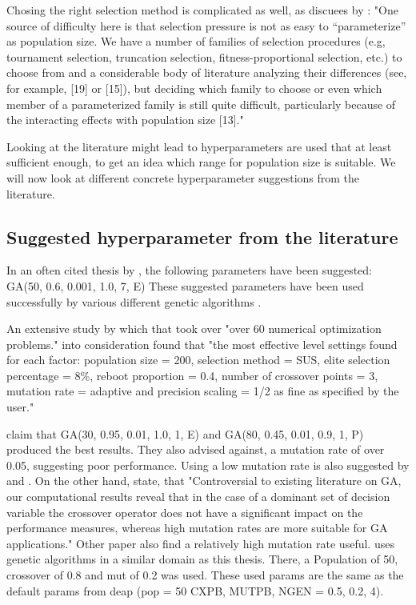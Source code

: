 Chosing the right selection method is complicated as well, as discuees by \cite{kacprzyk_parameter_2007}:
"One source of difficulty here is that selection pressure is not as easy to “parameterize” as population size. We have a number of families of selection procedures (e.g, tournament selection, truncation selection, fitness-proportional selection, etc.) to choose from and a considerable body of literature analyzing their differences (see, for example, [19] or [15]), but deciding which family to choose or even which member of a parameterized family is still quite difficult, particularly because of the interacting effects with population size [13]."

Looking at the literature might lead to hyperparameters are used that at least sufficient enough, to get an idea which range for population size is suitable. We will now look at different concrete hyperparameter suggestions from the literature.

\subsection{Suggested hyperparameter from the literature}
In an often cited thesis by \cite{de_jong_analysis_1975}, the following parameters have been suggested:
GA(50, 0.6, 0.001, 1.0, 7, E) These suggested parameters have been used successfully by various different genetic algorithms \cite{grefenstette_optimization_1986}. 

An extensive study by \cite{mills_determining_2015} which that took over "over 60 numerical optimization problems." into consideration found that "the most effective level settings found for each factor: population size = 200, selection method = SUS, elite selection percentage = 8\%, reboot proportion = 0.4, number of crossover points = 3, mutation rate = adaptive and precision scaling = 1/2 as fine as specified by the user."

\cite{grefenstette_optimization_1986} claim that GA(30, 0.95, 0.01, 1.0, 1, E) and GA(80, 0.45, 0.01, 0.9, 1, P) produced the best results. They also advised against, a mutation rate of over 0.05, suggesting poor performance. Using a low mutation rate is also suggested by \cite{whitley_genetic_1994} and \cite{jinghui_zhong_comparison_2005}. 
On the other hand, \cite{boyabatli_parameter_2004} state, that "Controversial to existing literature on GA, our computational results reveal that in the case of a dominant set of decision variable the crossover operator does not have a significant impact on the performance measures, whereas high mutation rates are more suitable for GA applications."
Other paper also find a relatively high mutation rate useful. \cite{almanee_scenorita_2021} uses genetic algorithms in a similar domain as this thesis. There, a Population of 50, crossover of 0.8 and mut of 0.2 was used. These used params are the same as the default params from deap (pop = 50 CXPB, MUTPB, NGEN = 0.5, 0.2, 4). 

